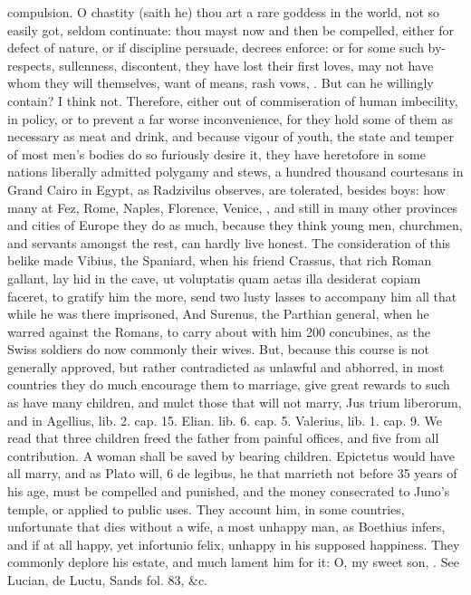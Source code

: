 {compulsion. O chastity (saith he) thou art a rare goddess in the
world, not so easily got, seldom continuate: thou mayst now and then be
compelled, either for defect of nature, or if discipline persuade,
decrees enforce: or for some such by-respects, sullenness, discontent,
they have lost their first loves, may not have whom they will
themselves, want of means, rash vows, \etc{}. But can he willingly contain?
I think not. Therefore, either out of commiseration of human
imbecility, in policy, or to prevent a far worse inconvenience, for
they hold some of them as necessary as meat and drink, and because
vigour of youth, the state and temper of most men's bodies do so
furiously desire it, they have heretofore in some nations liberally
admitted polygamy and stews, a hundred thousand courtesans in Grand
Cairo in Egypt, as Radzivilus observes, are tolerated, besides
boys: how many at Fez, Rome, Naples, Florence, Venice, \etc{}, and still
in many other provinces and cities of Europe they do as much, because
they think young men, churchmen, and servants amongst the rest, can
hardly live honest. The consideration of this belike made Vibius, the
Spaniard, when his friend Crassus, that rich Roman gallant, lay
hid in the cave, ut voluptatis quam aetas illa desiderat copiam
faceret, to gratify him the more, send two lusty lasses to
accompany him all that while he was there imprisoned, And Surenus, the
Parthian general, when he warred against the Romans, to carry about
with him 200 concubines, as the Swiss soldiers do now commonly their
wives. But, because this course is not generally approved, but rather
contradicted as unlawful and abhorred, in most countries they do
much encourage them to marriage, give great rewards to such as have
many children, and mulct those that will not marry, Jus trium
liberorum, and in Agellius, lib. 2. cap. 15. Elian. lib. 6. cap. 5.
Valerius, lib. 1. cap. 9. We read that three children freed the
father from painful offices, and five from all contribution. A woman
shall be saved by bearing children. Epictetus would have all marry, and
as Plato will, 6 de legibus, he that marrieth not before 35 years
of his age, must be compelled and punished, and the money consecrated
to Juno's temple, or applied to public uses. They account him, in
some countries, unfortunate that dies without a wife, a most unhappy
man, as Boethius infers, and if at all happy, yet infortunio
felix, unhappy in his supposed happiness. They commonly deplore his
estate, and much lament him for it: O, my sweet son, \etc{}. See Lucian, de
Luctu, Sands fol. 83, \&c.

}
